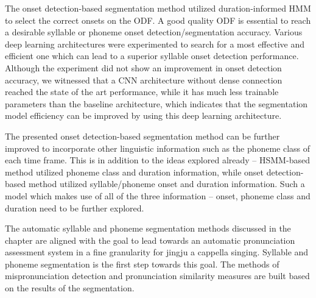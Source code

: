 The onset detection-based segmentation method utilized duration-informed \gls{HMM} to select the correct onsets on the \gls{ODF}. A good quality \gls{ODF} is essential to reach a desirable syllable or phoneme onset detection/segmentation accuracy. Various deep learning architectures were experimented to search for a most effective and efficient one which can lead to a superior syllable onset detection performance. Although the experiment did not show an improvement in onset detection accuracy, we witnessed that a \gls{CNN} architecture without dense connection reached the state of the art performance, while it has much less trainable parameters than the baseline architecture, which indicates that the segmentation model efficiency can be improved by using this deep learning architecture.

The presented onset detection-based segmentation method can be further improved to incorporate other linguistic information such as the phoneme class of each time frame. This is in addition to the ideas explored already -- \gls{HSMM}-based method utilized phoneme class and duration information, while onset detection-based method utilized syllable/phoneme onset and duration information. Such a model which makes use of all of the three information -- onset, phoneme class and duration need to be further explored.

The automatic syllable and phoneme segmentation methods discussed in the chapter are aligned with the goal to lead towards an automatic pronunciation assessment system in a fine granularity for jingju a cappella singing. Syllable and phoneme segmentation is the first step towards this goal. The methods of mispronunciation detection and pronunciation similarity measures are built based on the results of the segmentation.
